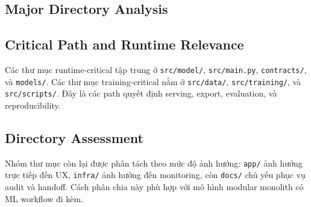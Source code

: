 \subsection{Major Directory Analysis}
\subsection{Critical Path and Runtime Relevance}
Các thư mục runtime-critical tập trung ở \texttt{src/model/}, \texttt{src/main.py}, \texttt{contracts/}, và \texttt{models/}. Các thư mục training-critical nằm ở \texttt{src/data/}, \texttt{src/training/}, và \texttt{src/scripts/}. Đây là các path quyết định serving, export, evaluation, và reproducibility.

\subsection{Directory Assessment}
Nhóm thư mục còn lại được phân tách theo mức độ ảnh hưởng: \texttt{app/} ảnh hưởng trực tiếp đến UX, \texttt{infra/} ảnh hưởng đến monitoring, còn \texttt{docs/} chủ yếu phục vụ audit và handoff. Cách phân chia này phù hợp với mô hình modular monolith có ML workflow đi kèm.

